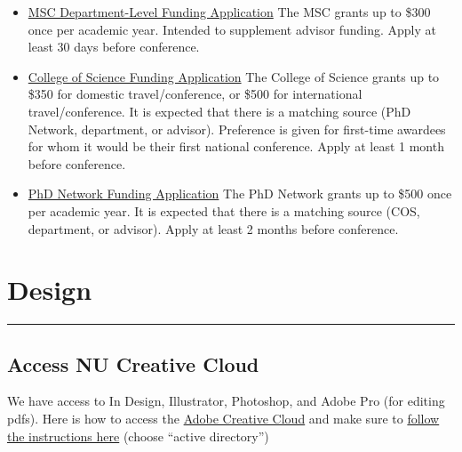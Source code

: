\documentclass[
  letterpaper,
  DIV=11,
  numbers=noendperiod]{scrreprt}
\begin{document}
\begin{itemize}
\item
  \href{https://drive.google.com/file/d/1Lb_1kdAgfSQqCOqkyCWnVshKLY8Y7MHT/view?usp=sharing}{MSC
  Department-Level Funding Application} The MSC grants up to \$300 once
  per academic year. Intended to supplement advisor funding. Apply at
  least 30 days before conference.
\item
  \href{https://forms.office.com/pages/responsepage.aspx?id=gcLuqKOqrk2sm5o5i5IV5yDZoNSxGVNDmDTVJk5ayVFURVRETTY1MUZUUDIzNzRHVFRGQkpaWTBZTi4u}{College
  of Science Funding Application} The College of Science grants up to
  \$350 for domestic travel/conference, or \$500 for international
  travel/conference. It is expected that there is a matching source (PhD
  Network, department, or advisor). Preference is given for first-time
  awardees for whom it would be their first national conference. Apply
  at least 1 month before conference.
\item
  \href{https://phd.northeastern.edu/network/resources/travelfunding/}{PhD
  Network Funding Application} The PhD Network grants up to \$500 once
  per academic year. It is expected that there is a matching source
  (COS, department, or advisor). Apply at least 2 months before
  conference.\\
\end{itemize}

\hypertarget{design}{%
\chapter{Design}\label{design}}

\begin{center}\rule{0.5\linewidth}{0.5pt}\end{center}

\hypertarget{access-nu-creative-cloud}{%
\section*{\texorpdfstring{\textbf{Access NU Creative
Cloud}}{Access NU Creative Cloud}}\label{access-nu-creative-cloud}}

We have access to In Design, Illustrator, Photoshop, and Adobe Pro (for
editing pdfs). Here is how to access the
\href{https://adobe.northeastern.edu/}{Adobe Creative Cloud} and make
sure to
\href{https://service.northeastern.edu/ogs?id=kb_article\&sys_id=4128ecdb1b42745069590dc1604bcbb2}{follow
the instructions here} (choose ``active directory'')
\end{document}
